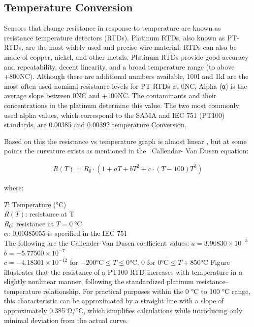 \subsection{Temperature Conversion}
Sensors that change resistance in response to temperature are known as
resistance temperature detectors (RTDs). Platinum RTDs, also known as
PT-RTDs, are the most widely used and precise wire material. RTDs can
also be made of copper, nickel, and other metals. Platinum RTDs provide
good accuracy and repeatability, decent linearity, and a broad
temperature range (to above +800NC). Although there are additional
numbers available, 100I and 1kI are the most often used nominal
resistance levels for PT-RTDs at 0NC. Alpha (α) is the average slope
between 0NC and +100NC. The contaminants and their concentrations in the
platinum determine this value. The two most commonly used alpha values,
which correspond to the SAMA and IEC 751 (PT100) standards, are 0.00385
and 0.00392 temperature Conversion.

Based on this the resistance vs temperature graph is almost linear , but
at some points the curvature exists as mentioned in the ~Callendar- Van
Dusen equation:

\begin{align*}
R(T) = R_0 \cdot (1 + aT + bT^2 +c \cdot (T - 100) T^3)
\end{align*}

where: 

$T$: Temperature (\unit{\degreeCelsius})\\
$R(T)$: resistance at T \\ 
$R_0$: resistance at $T = \SI{0}{\degreeCelsius}$\\ 
$\alpha$: 0.00385055 is specified in the IEC 751\\ 
The following are the Callender-Van Dusen coefficient values: 
$a = 3.90830 \times 10^{-3}$\\
$b = -5.77500 \times 10^{-7}$\\ 
$c = -4.18301 \times 10^{-12}$ for $-200 \unit{\degreeCelsius} \leq T \leq 0 \unit{\degreeCelsius}$, 0 for $0 \unit{\degreeCelsius} \leq T + 850 \unit{\degreeCelsius}$ 
Figure illustrates that the resistance of a PT100 RTD increases with
temperature in a slightly nonlinear manner, following the standardized
platinum resistance--temperature relationship. For practical purposes
within the 0 \unit{\degreeCelsius} to 100 \unit{\degreeCelsius} range, this characteristic can be approximated
by a straight line with a slope of approximately 0.385 \unit{\ohm}/\unit{\degreeCelsius}, which
simplifies calculations while introducing only minimal deviation from
the actual curve.

